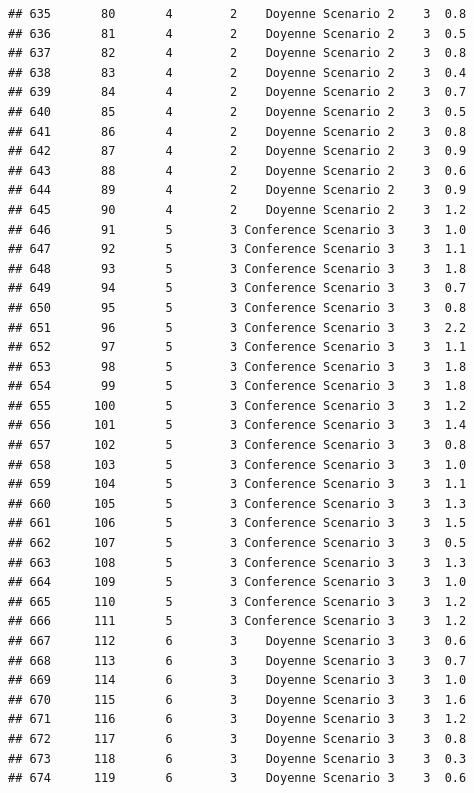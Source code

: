 \documentclass[
]{article}
\begin{document}
\begin{verbatim}
## 635       80       4        2    Doyenne Scenario 2    3  0.8
## 636       81       4        2    Doyenne Scenario 2    3  0.5
## 637       82       4        2    Doyenne Scenario 2    3  0.8
## 638       83       4        2    Doyenne Scenario 2    3  0.4
## 639       84       4        2    Doyenne Scenario 2    3  0.7
## 640       85       4        2    Doyenne Scenario 2    3  0.5
## 641       86       4        2    Doyenne Scenario 2    3  0.8
## 642       87       4        2    Doyenne Scenario 2    3  0.9
## 643       88       4        2    Doyenne Scenario 2    3  0.6
## 644       89       4        2    Doyenne Scenario 2    3  0.9
## 645       90       4        2    Doyenne Scenario 2    3  1.2
## 646       91       5        3 Conference Scenario 3    3  1.0
## 647       92       5        3 Conference Scenario 3    3  1.1
## 648       93       5        3 Conference Scenario 3    3  1.8
## 649       94       5        3 Conference Scenario 3    3  0.7
## 650       95       5        3 Conference Scenario 3    3  0.8
## 651       96       5        3 Conference Scenario 3    3  2.2
## 652       97       5        3 Conference Scenario 3    3  1.1
## 653       98       5        3 Conference Scenario 3    3  1.8
## 654       99       5        3 Conference Scenario 3    3  1.8
## 655      100       5        3 Conference Scenario 3    3  1.2
## 656      101       5        3 Conference Scenario 3    3  1.4
## 657      102       5        3 Conference Scenario 3    3  0.8
## 658      103       5        3 Conference Scenario 3    3  1.0
## 659      104       5        3 Conference Scenario 3    3  1.1
## 660      105       5        3 Conference Scenario 3    3  1.3
## 661      106       5        3 Conference Scenario 3    3  1.5
## 662      107       5        3 Conference Scenario 3    3  0.5
## 663      108       5        3 Conference Scenario 3    3  1.3
## 664      109       5        3 Conference Scenario 3    3  1.0
## 665      110       5        3 Conference Scenario 3    3  1.2
## 666      111       5        3 Conference Scenario 3    3  1.2
## 667      112       6        3    Doyenne Scenario 3    3  0.6
## 668      113       6        3    Doyenne Scenario 3    3  0.7
## 669      114       6        3    Doyenne Scenario 3    3  1.0
## 670      115       6        3    Doyenne Scenario 3    3  1.6
## 671      116       6        3    Doyenne Scenario 3    3  1.2
## 672      117       6        3    Doyenne Scenario 3    3  0.8
## 673      118       6        3    Doyenne Scenario 3    3  0.3
## 674      119       6        3    Doyenne Scenario 3    3  0.6

\end{verbatim}
\end{document}
